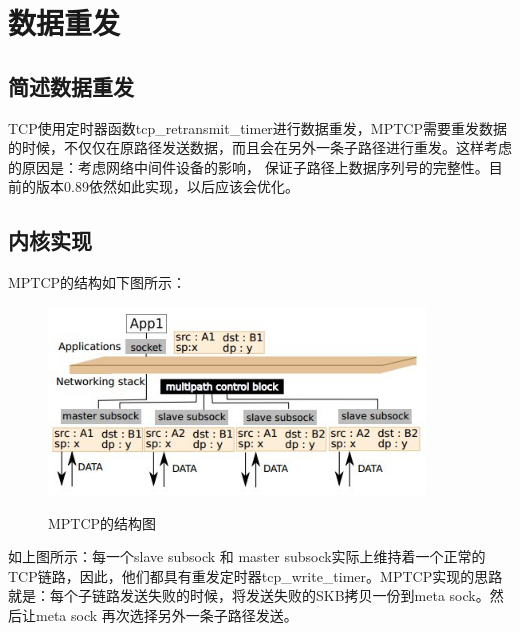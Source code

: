 \section{数据重发}
\subsection{简述数据重发}
TCP使用定时器函数tcp\_retransmit\_timer进行数据重发，MPTCP需要重发数据的时候，不仅仅在原路径发送数据，而且会在另外一条子路径进行重发。这样考虑的原因是：考虑网络中间件设备的影响， 保证子路径上数据序列号的完整性。目前的版本0.89依然如此实现，以后应该会优化。
\subsection{内核实现}
MPTCP的结构如下图所示：
\begin{figure}[H]
  \centering
  \includegraphics[width=10cm]{dias/Kernal.jpg}\\
  \caption{MPTCP的结构图}
\end{figure}
如上图所示：每一个slave subsock 和 master subsock实际上维持着一个正常的TCP链路，因此，他们都具有重发定时器tcp\_write\_timer。MPTCP实现的思路就是：每个子链路发送失败的时候，将发送失败的SKB拷贝一份到meta sock。然后让meta sock 再次选择另外一条子路径发送。

